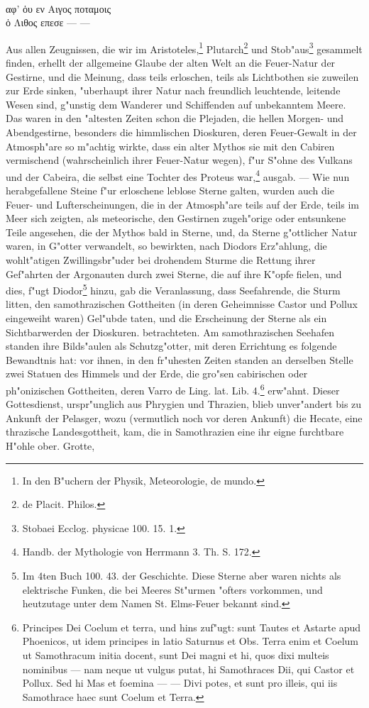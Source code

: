 \documentclass[a4paper, 11pt, oneside, polutonikogreek, german]{article}
\begin{document}
\vspace{1pt}
\\
αφ' ὁυ εν Αιγος ποταμοις\\
ὁ Λιθος επεσε --- ---\\
\vspace{1pt}

Aus allen Zeugnissen, die wir im Aristoteles,\footnote{In den B"uchern der Physik, Meteorologie, de mundo.} Plutarch\footnote{de Placit. Philos.} und Stob"aus\footnote{Stobaei Ecclog. physicae 100. 15. 1.} gesammelt finden, erhellt der allgemeine Glaube der alten Welt an die Feuer-Natur der Gestirne, und die Meinung, dass teils erloschen, teils als Lichtbothen sie zuweilen zur Erde sinken, "uberhaupt ihrer Natur nach freundlich leuchtende, leitende Wesen sind, g"unstig dem Wanderer und Schiffenden auf unbekanntem Meere. Das waren in den "altesten Zeiten schon die Plejaden, die hellen Morgen- und Abendgestirne, besonders die himmlischen Dioskuren, deren Feuer-Gewalt in der Atmosph"are so m"achtig wirkte, dass ein alter Mythos sie mit den Cabiren vermischend (wahrscheinlich ihrer Feuer-Natur wegen), f"ur S"ohne des Vulkans und der Cabeira, die selbst eine Tochter des Proteus war,\footnote{Handb. der Mythologie von Herrmann 3. Th. S. 172.} ausgab. --- Wie nun herabgefallene Steine f"ur erloschene leblose Sterne galten, wurden auch die Feuer- und Lufterscheinungen, die in der Atmosph"are teils auf der Erde, teils im Meer sich zeigten, als meteorische, den Gestirnen zugeh"orige oder entsunkene Teile angesehen, die der Mythos bald in Sterne, und, da Sterne g"ottlicher Natur waren, in G"otter verwandelt, so bewirkten, nach Diodors Erz"ahlung, die wohlt"atigen Zwillingsbr"uder bei drohendem Sturme die Rettung ihrer Gef"ahrten der Argonauten durch zwei Sterne, die auf ihre K"opfe fielen, und dies, f"ugt Diodor\footnote{Im 4ten Buch 100. 43. der Geschichte. Diese Sterne aber waren nichts als elektrische Funken, die bei Meeres St"urmen "ofters vorkommen, und heutzutage unter dem Namen St. Elms-Feuer bekannt sind.} hinzu, gab die Veranlassung, dass Seefahrende, die Sturm litten, den samothrazischen Gottheiten (in deren Geheimnisse Castor und Pollux eingeweiht waren) Gel"ubde taten, und die Erscheinung der Sterne als ein Sichtbarwerden der Dioskuren. betrachteten. Am samothrazischen Seehafen standen ihre Bilds"aulen als Schutzg"otter, mit deren Errichtung es folgende Bewandtnis hat: vor ihnen, in den fr"uhesten Zeiten standen an derselben Stelle zwei Statuen des Himmels und der Erde, die gro"sen cabirischen oder ph"onizischen Gottheiten, deren Varro de Ling. lat. Lib. 4.\footnote{Principes Dei Coelum et terra, und hins zuf"ugt: sunt Tautes et Astarte apud Phoenicos, ut idem principes in latio Saturnus et Obs. Terra enim et Coelum ut Samothracum initia docent, sunt Dei magni et hi, quos dixi multeis nominibus --- nam neque ut vulgus putat, hi Samothraces Dii, qui Castor et Pollux. Sed hi Mas et foemina --- --- Divi potes, et sunt pro illeis, qui iis Samothrace haec sunt Coelum et Terra.} erw"ahnt. Dieser Gottesdienst, urspr"unglich aus Phrygien und Thrazien, blieb unver"andert bis zu Ankunft der Pelasger, wozu (vermutlich noch vor deren Ankunft) die Hecate, eine thrazische Landesgottheit, kam, die in Samothrazien eine ihr eigne furchtbare H"ohle ober. Grotte, 
\end{document}
